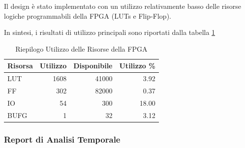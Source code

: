 \documentclass{article}
\begin{document}
Il design è stato implementato con un utilizzo relativamente basso delle risorse logiche programmabili della FPGA (LUTs e Flip-Flop).

In sintesi, i risultati di utilizzo principali sono riportati dalla tabella \ref{tab:resource_utilization_summary}

\begin{table}[H]
    \centering
    \caption{Riepilogo Utilizzo delle Risorse della FPGA}
    \label{tab:resource_utilization_summary}
    \begin{tabular}{|l|r|r|r|}
        \hline
        \textbf{Risorsa} & \textbf{Utilizzo} & \textbf{Disponibile} & \textbf{Utilizzo \%} \\
        \hline
        LUT & 1608 & 41000 & 3.92 \\
        FF & 302 & 82000 & 0.37 \\
        IO & 54 & 300 & 18.00 \\
        BUFG & 1 & 32 & 3.12 \\
        \hline
    \end{tabular}
\end{table}

\subsubsection{Report di Analisi Temporale}
\end{document}
